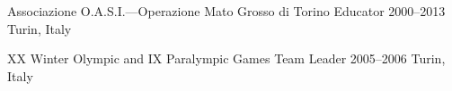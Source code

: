 \begin{cventries}

    
  \cventry
    {Associazione O.A.S.I.---Operazione Mato Grosso di Torino} %
    {Educator} %
    {2000--2013} %
    {Turin, Italy} %
    {}

    
\cventry
    {XX Winter Olympic and IX Paralympic Games} %
    {Team Leader} %
    {2005--2006} %
    {Turin, Italy} %
    {}

    
\end{cventries}
